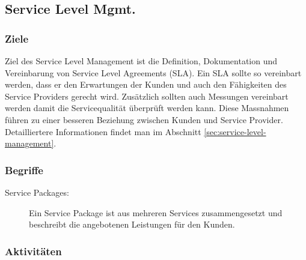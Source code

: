 \subsection{Service Level Mgmt.}

\subsubsection{Ziele}

Ziel des Service Level Management ist die Definition, Dokumentation und Vereinbarung von Service Level Agreements (SLA). Ein SLA sollte so vereinbart werden, dass er den Erwartungen der Kunden und auch den Fähigkeiten des Service Providers gerecht wird. Zusätzlich sollten auch Messungen vereinbart werden damit die Servicequalität überprüft werden kann. Diese Massnahmen führen zu einer besseren Beziehung zwischen Kunden und Service Provider. Detailliertere Informationen findet man im Abschnitt \ref{sec:service-level-management}.

\subsubsection{Begriffe}

\begin{description}
	\item[Service Packages:] Ein Service Package ist aus mehreren Services zusammengesetzt und beschreibt die angebotenen Leistungen für den Kunden.
\end{description}

\subsubsection{Aktivitäten}

